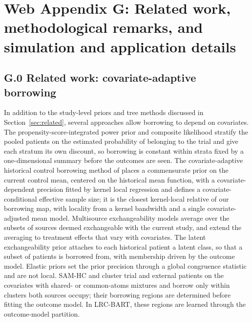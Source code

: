 
\setcounter{table}{0}
\renewcommand{\thetable}{S\arabic{table}}
\renewcommand{\theHtable}{supp.\arabic{table}}
\setcounter{figure}{0}
\renewcommand{\thefigure}{S\arabic{figure}}

\section*{Web Appendix G: Related work, methodological remarks, and simulation and application details}

\subsection*{G.0 Related work: covariate-adaptive borrowing}

In addition to the study-level priors and tree methods discussed in Section~\ref{sec:related}, several approaches allow borrowing to depend on covariates. The propensity-score-integrated power prior \citep{Wang2019PSPP} and composite likelihood \citep{Chen2020PSCL} stratify the pooled patients on the estimated probability of belonging to the trial and give each stratum its own discount, so borrowing is constant within strata fixed by a one-dimensional summary before the outcomes are seen. The covariate-adaptive historical control borrowing method of \citet{Jin2023CAHB} places a commensurate prior on the current control mean, centered on the historical mean function, with a covariate-dependent precision fitted by kernel local regression and defines a covariate-conditional effective sample size; it is the closest kernel-local relative of our borrowing map, with locality from a kernel bandwidth and a single covariate-adjusted mean model. Multisource exchangeability models \citep{Kaizer2018MEM} average over the subsets of sources deemed exchangeable with the current study, and \citet{Kotalik2021} extend the averaging to treatment effects that vary with covariates. The latent exchangeability prior \citep{Alt2024LEAP} attaches to each historical patient a latent class, so that a subset of patients is borrowed from, with membership driven by the outcome model. Elastic priors \citep{Jiang2023elastic} set the prior precision through a global congruence statistic and are not local. SAM-HC \citep{Bi2026SAMHC} and \citet{Chandra2023} cluster trial and external patients on the covariates with shared- or common-atoms mixtures and borrow only within clusters both sources occupy; their borrowing regions are determined before fitting the outcome model. In LRC-BART, these regions are learned through the outcome-model partition.

